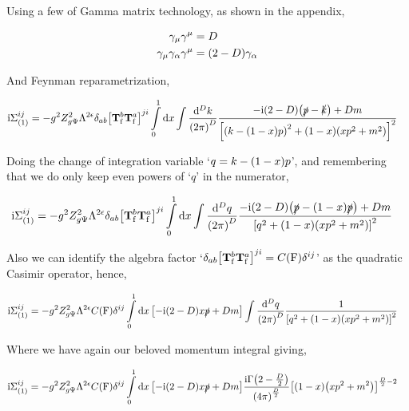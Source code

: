 Using a few of Gamma matrix technology, as shown in the appendix,

\begin{align}
    \gamma_\mu \gamma^\mu&=D\nonumber\\
    \gamma_\mu\gamma_\alpha\gamma^\mu&=\qty(2-D)\gamma_\alpha\nonumber
\end{align}

And Feynman reparametrization,

\begin{align}
    \textnormal{i}\Sigma^{ij}_{\qty(1)}&=-g^2Z_{g\Psi}^2\Lambda^{2\epsilon}\delta_{ab}\qty[\vb T^b_{\textnormal f}\vb T^a_{\textnormal f}]^{ji}
    \int\limits_0^1\dd{x}\int\frac{\dd[D]{k}}{\qty(2\pi)^D}
    \frac{-\textnormal{i}\qty(2-D)\qty(\slashed p-\slashed k)+Dm}{\qty[\qty(k-\qty(1-x)p)^2+\qty(1-x)\qty(xp^2+m^2)]^2}\nonumber
\end{align}

Doing the change of integration variable `$q=k-\qty(1-x)p$', and remembering that we do only keep even powers 
of `$q$' in the numerator,

\begin{align}
    \textnormal{i}\Sigma^{ij}_{\qty(1)}&=-g^2Z_{g\Psi}^2\Lambda^{2\epsilon}\delta_{ab}\qty[\vb T^b_{\textnormal f}\vb T^a_{\textnormal f}]^{ji}
    \int\limits_0^1\dd{x}\int\frac{\dd[D]{q}}{\qty(2\pi)^D}
    \frac{-\textnormal{i}\qty(2-D)\qty(\slashed p-\qty(1-x)\slashed p)+Dm}{\qty[q^2+\qty(1-x)\qty(xp^2+m^2)]^2}\nonumber
\end{align}

Also we can identify the algebra factor `$\delta_{ab}\qty[\vb T^b_{\textnormal f}\vb T^a_{\textnormal f}]^{ji}=C\qty(\textnormal{F})\delta^{ij}$' 
as the quadratic Casimir operator, hence,

\begin{align}
    \textnormal{i}\Sigma^{ij}_{\qty(1)}&=-g^2Z_{g\Psi}^2\Lambda^{2\epsilon}C\qty(\textnormal{F})\delta^{ij}
    \int\limits_0^1\dd{x}\qty[-\textnormal{i}\qty(2-D)x\slashed p+Dm]\int\frac{\dd[D]{q}}{\qty(2\pi)^D}
    \frac{1}{\qty[q^2+\qty(1-x)\qty(xp^2+m^2)]^2}\nonumber
\end{align}

Where we have again our beloved momentum integral giving,

\begin{align}
    \textnormal{i}\Sigma^{ij}_{\qty(1)}&=-g^2Z_{g\Psi}^2\Lambda^{2\epsilon}C\qty(\textnormal{F})\delta^{ij}
    \int\limits_0^1\dd{x}\qty[-\textnormal{i}\qty(2-D)x\slashed p+Dm]\frac{\textnormal{i}\Gamma\qty(2-\frac D2)}{\qty(4\pi)^{\frac D2}}
    \qty[\qty(1-x)\qty(xp^2+m^2)]^{\frac D2-2}\nonumber
\end{align}

